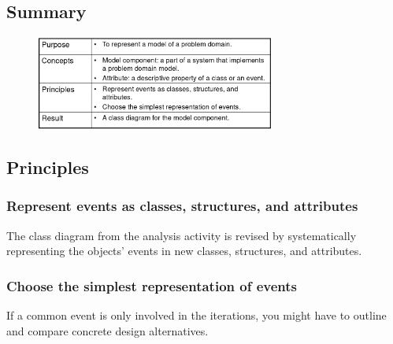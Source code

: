 \subsection{Summary}
\begin{figure}[H]
    \centering
    \includegraphics[width=0.7\textwidth]{figures/modelcomponentsummary.png}
\end{figure}

\subsection{Principles}
\subsubsection{Represent events as classes, structures, and attributes}
The class diagram from the analysis activity is revised by systematically representing the objects' events in new classes, structures, and attributes.

\subsubsection{Choose the simplest representation of events}
If a common event is only involved in the iterations, you might have to outline and compare concrete design alternatives.

